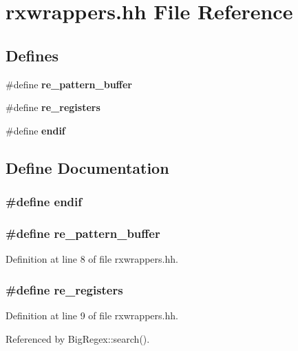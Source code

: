 \section{rxwrappers.hh File Reference}
\label{rxwrappers_8hh}
\subsection*{Defines}
\begin{CompactItemize}
\item 
\#define {\bf re\_\-pattern\_\-buffer}
\item 
\#define {\bf re\_\-registers}
\item 
\#define {\bf endif}
\end{CompactItemize}


\subsection{Define Documentation}
\subsubsection{\setlength{\rightskip}{0pt plus 5cm}\#define endif}\label{rxwrappers_8hh_a2}


\subsubsection{\setlength{\rightskip}{0pt plus 5cm}\#define re\_\-pattern\_\-buffer}\label{rxwrappers_8hh_a0}




Definition at line 8 of file rxwrappers.hh.
\subsubsection{\setlength{\rightskip}{0pt plus 5cm}\#define re\_\-registers}\label{rxwrappers_8hh_a1}




Definition at line 9 of file rxwrappers.hh.

Referenced by Big\-Regex::search().